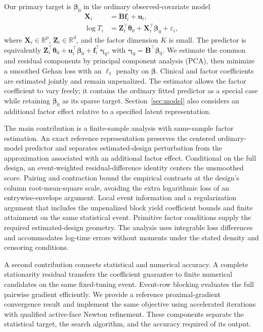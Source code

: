 Our primary target is $\bm{\beta}_0$ in the ordinary observed-covariate model
\begin{equation}
 \begin{aligned}
 \bm{X}_i&=\bm{B}\bm{f}_i+\bm{u}_i,\\
 \log T_i&=\bm{Z}_i^\top\bm{\theta}_0+\bm{X}_i^\top\bm{\beta}_0+\varepsilon_i,
 \end{aligned}
 \label{eq:intro-model}
\end{equation}
where $\bm{X}_i\in\mathbb R^p$, $\bm{Z}_i\in\mathbb R^d$, and the factor dimension $K$ is small. The predictor is equivalently $\bm{Z}_i^\top\bm{\theta}_0+\bm{u}_i^\top\bm{\beta}_0+\bm{f}_i^\top\bm{\gamma}_0$, with $\bm{\gamma}_0=\bm{B}^\top\bm{\beta}_0$. We estimate the common and residual components by principal component analysis (PCA), then minimize a smoothed Gehan loss with an $\ell_1$ penalty on $\bm{\beta}$. Clinical and factor coefficients are estimated jointly and remain unpenalized. The estimator allows the factor coefficient to vary freely; it contains the ordinary fitted predictor as a special case while retaining $\bm{\beta}_0$ as its sparse target. Section~\ref{sec:model} also considers an additional factor effect relative to a specified latent representation.

The main contribution is a finite-sample analysis with same-sample factor estimation. An exact reference representation preserves the centered ordinary-model predictor and separates estimated-design perturbation from the approximation associated with an additional factor effect. Conditional on the full design, an event-weighted residual-difference identity centers the unsmoothed score. Pairing and contraction bound the empirical contrasts at the design's column root-mean-square scale, avoiding the extra logarithmic loss of an entrywise-envelope argument. Local event information and a regularization argument that includes the unpenalized block yield coefficient bounds and finite attainment on the same statistical event. Primitive factor conditions supply the required estimated-design geometry. The analysis uses integrable loss differences and accommodates log-time errors without moments under the stated density and censoring conditions.

A second contribution connects statistical and numerical accuracy. A complete stationarity residual transfers the coefficient guarantee to finite numerical candidates on the same fixed-tuning event. Event-row blocking evaluates the full pairwise gradient efficiently. We provide a reference proximal-gradient convergence result and implement the same objective using accelerated iterations with qualified active-face Newton refinement. These components separate the statistical target, the search algorithm, and the accuracy required of its output.

